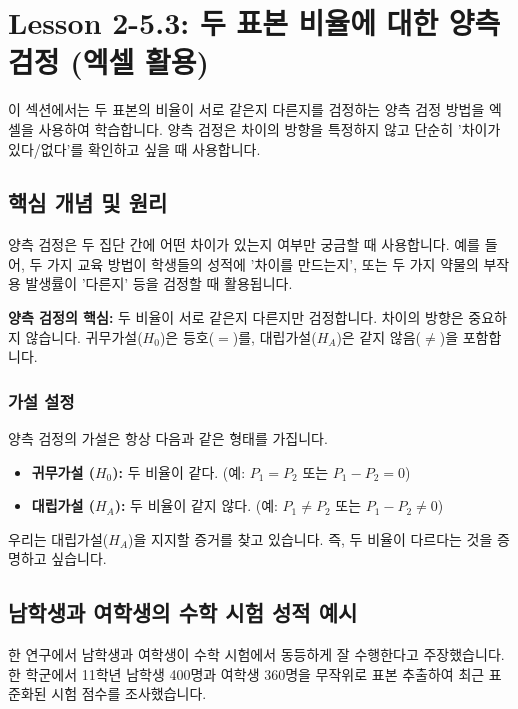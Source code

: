 \documentclass[11pt,a4paper]{article}
\begin{document}
\newpage
\section{Lesson 2-5.3: 두 표본 비율에 대한 양측 검정 (엑셀 활용)}

이 섹션에서는 두 표본의 비율이 서로 같은지 다른지를 검정하는 양측 검정 방법을 엑셀을 사용하여 학습합니다. 양측 검정은 차이의 방향을 특정하지 않고 단순히 '차이가 있다/없다'를 확인하고 싶을 때 사용합니다.

\subsection{핵심 개념 및 원리}

양측 검정은 두 집단 간에 어떤 차이가 있는지 여부만 궁금할 때 사용합니다. 예를 들어, 두 가지 교육 방법이 학생들의 성적에 '차이를 만드는지', 또는 두 가지 약물의 부작용 발생률이 '다른지' 등을 검정할 때 활용됩니다.

\begin{summarybox}
\textbf{양측 검정의 핵심:}
두 비율이 서로 같은지 다른지만 검정합니다. 차이의 방향은 중요하지 않습니다.
귀무가설($H_0$)은 등호($=$)를, 대립가설($H_A$)은 같지 않음($\neq$)을 포함합니다.
\end{summarybox}

\subsubsection{가설 설정}
양측 검정의 가설은 항상 다음과 같은 형태를 가집니다.

\begin{itemize}
    \item \textbf{귀무가설 ($H_0$):} 두 비율이 같다. (예: $P_1 = P_2$ 또는 $P_1 - P_2 = 0$)
    \item \textbf{대립가설 ($H_A$):} 두 비율이 같지 않다. (예: $P_1 \neq P_2$ 또는 $P_1 - P_2 \neq 0$)
\end{itemize}
우리는 대립가설($H_A$)을 지지할 증거를 찾고 있습니다. 즉, 두 비율이 다르다는 것을 증명하고 싶습니다.

\subsection{남학생과 여학생의 수학 시험 성적 예시}

한 연구에서 남학생과 여학생이 수학 시험에서 동등하게 잘 수행한다고 주장했습니다. 한 학군에서 11학년 남학생 400명과 여학생 360명을 무작위로 표본 추출하여 최근 표준화된 시험 점수를 조사했습니다.
\end{document}
